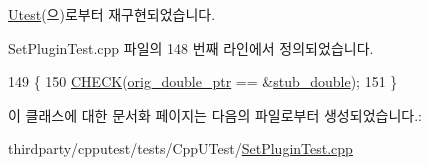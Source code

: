 \hyperlink{class_utest_ae62cdb23024dce723301fba2479b52a4}{Utest}(으)로부터 재구현되었습니다.



Set\+Plugin\+Test.\+cpp 파일의 148 번째 라인에서 정의되었습니다.


\begin{DoxyCode}
149    \{
150       \hyperlink{_utest_macros_8h_a3e1cfef60e774a81f30eaddf26a3a274}{CHECK}(\hyperlink{_set_plugin_test_8cpp_a366d0f07ea842016c0c9fbdc88fafabc}{orig\_double\_ptr} == &\hyperlink{_set_plugin_test_8cpp_a5b99becf565c9b2b074924dca816bf6e}{stub\_double});
151    \}
\end{DoxyCode}


이 클래스에 대한 문서화 페이지는 다음의 파일로부터 생성되었습니다.\+:\begin{DoxyCompactItemize}
\item 
thirdparty/cpputest/tests/\+Cpp\+U\+Test/\hyperlink{_set_plugin_test_8cpp}{Set\+Plugin\+Test.\+cpp}\end{DoxyCompactItemize}
